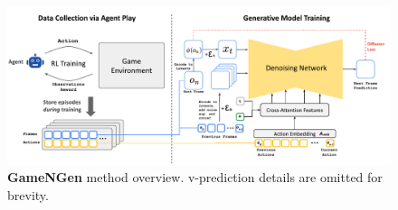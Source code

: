 \begin{figure}
    \centering
    \includegraphics[width=0.99\linewidth]{figures/Architecture_08_27_b.pdf}
    \caption{\textbf{GameNGen} method overview. v-prediction details are omitted for brevity.}
    \label{fig:Overview}
\end{figure}